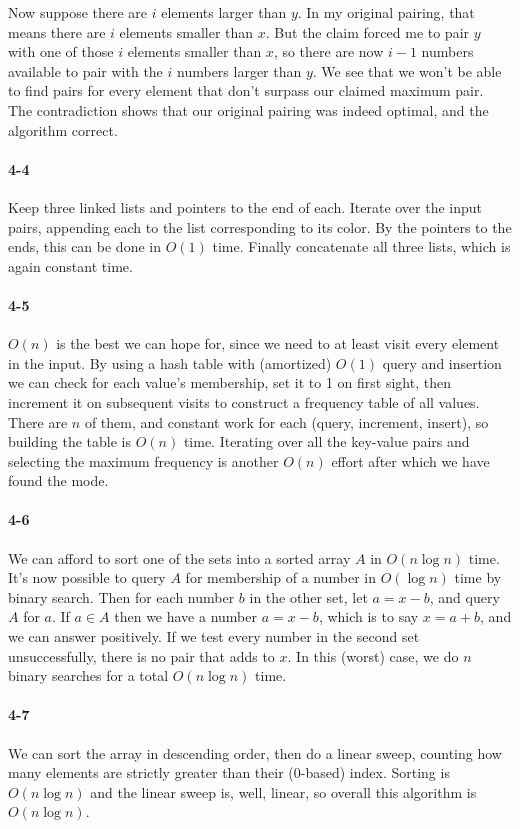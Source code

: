 \documentclass{report}
\begin{document}
Now suppose there are $i$ elements larger than $y$. In my original pairing, that means there are $i$ elements smaller than $x$. But the claim forced me to pair $y$ with one of those $i$ elements smaller than $x$, so there are now $i-1$ numbers available to pair with the $i$ numbers larger than $y$. We see that we won't be able to find pairs for every element that don't surpass our claimed maximum pair. The contradiction shows that our original pairing was indeed optimal, and the algorithm correct.

\paragraph{4-4} Keep three linked lists and pointers to the end of each. Iterate over the input pairs, appending each to the list corresponding to its color. By the pointers to the ends, this can be done in $O(1)$ time. Finally concatenate all three lists, which is again constant time.

\paragraph{4-5} $O(n)$ is the best we can hope for, since we need to at least visit every element in the input. By using a hash table with (amortized) $O(1)$ query and insertion we can check for each value's membership, set it to 1 on first sight, then increment it on subsequent visits to construct a frequency table of all values. There are $n$ of them, and constant work for each (query, increment, insert), so building the table is $O(n)$ time. Iterating over all the key-value pairs and selecting the maximum frequency is another $O(n)$ effort after which we have found the mode.

\paragraph{4-6} We can afford to sort one of the sets into a sorted array $A$ in $O(n\log n)$ time. It's now possible to query $A$ for membership of a number in $O(\log n)$ time by binary search. Then for each number $b$ in the other set, let $a = x-b$, and query $A$ for $a$. If $a\in A$ then we have a number $a = x-b$, which is to say $x = a+b$, and we can answer positively. If we test every number in the second set unsuccessfully, there is no pair that adds to $x$. In this (worst) case, we do $n$ binary searches for a total $O(n\log n)$ time.

\paragraph{4-7} We can sort the array in descending order, then do a linear sweep, counting how many elements are strictly greater than their (0-based) index. Sorting is $O(n\log n)$ and the linear sweep is, well, linear, so overall this algorithm is $O(n\log n)$.
\end{document}
